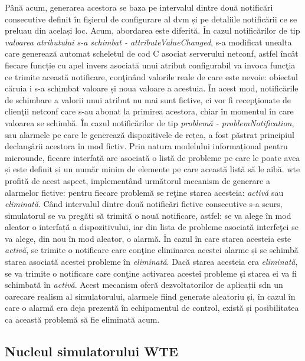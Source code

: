 Până acum, generarea acestora se baza pe intervalul dintre două notificări consecutive definit în fişierul de configurare al \gls{dvm} și pe detaliile notificării ce se preluau din același loc. Acum, abordarea este diferită. În cazul notificărilor de tip \textit{valoarea atributului s-a schimbat - attributeValueChanged}, s-a modificat unealta care generează automat scheletul de cod C asociat serverului \gls{netconf}, astfel încât fiecare funcție cu apel invers asociată unui atribut configurabil va invoca funcţia ce trimite această notificare, conţinând valorile reale de care este nevoie: obiectul căruia i s-a schimbat valoare și noua valoare a acestuia. În acest mod, notificările de schimbare a valorii unui atribut nu mai sunt fictive, ci vor fi recepţionate de clienţii \gls{netconf} care s-au abonat la primirea acestora, chiar în momentul în care valoarea se schimbă. În cazul notificărilor de tip \textit{problemă - problemNotification}, sau alarmele pe care le generează dispozitivele de rețea, a fost păstrat principiul declanşării acestora în mod fictiv. Prin natura modelului informațional pentru microunde, fiecare interfață are asociată o listă de probleme pe care le poate avea și este definit și un număr minim de elemente pe care această listă să le aibă. \gls{wte} profită de acest aspect, implementând următorul mecanism de generare a alarmelor fictive: pentru fiecare problemă se reţine starea acesteia: \textit{activă} sau \textit{eliminată}. Când intervalul dintre două notificări fictive consecutive s-a scurs, simulatorul se va pregăti să trimită o nouă notificare, astfel: se va alege în mod aleator o interfață a dispozitivului, iar din lista de probleme asociată interfeţei se va alege, din nou în mod aleator, o alarmă. În cazul în care starea acesteia este \textit{activă}, se trimite o notificare care conţine eliminarea acestei alarme și se schimbă starea asociată acestei probleme în \textit{eliminată}. Dacă starea acesteia era \textit{eliminată}, se va trimite o notificare care conţine activarea acestei probleme și starea ei va fi schimbată în \textit{activă}. Acest mecanism oferă dezvoltatorilor de aplicații \gls{sdn} un oarecare realism al simulatorului, alarmele fiind generate aleatoriu și, în cazul în care o alarmă era deja prezentă în echipamentul de control, există și posibilitatea ca această problemă să fie eliminată acum.

\subsection{Nucleul simulatorului WTE}

